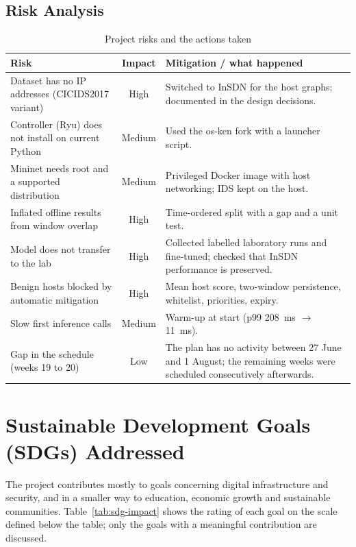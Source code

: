 \begin{appendices}
\section{Risk Analysis}
\begin{table}[htbp]
\centering
\caption{Project risks and the actions taken}
\label{tab:risks}
\small
\begin{tabularx}{\textwidth}{|p{4.0cm}|c|X|}
\hline
\textbf{Risk} & \textbf{Impact} & \textbf{Mitigation / what happened} \\ \hline
Dataset has no IP addresses (CICIDS2017 variant) & High & Switched to InSDN for the host graphs; documented in the design decisions. \\ \hline
Controller (Ryu) does not install on current Python & Medium & Used the os-ken fork with a launcher script. \\ \hline
Mininet needs root and a supported distribution & Medium & Privileged Docker image with host networking; IDS kept on the host. \\ \hline
Inflated offline results from window overlap & High & Time-ordered split with a gap and a unit test. \\ \hline
Model does not transfer to the lab & High & Collected labelled laboratory runs and fine-tuned; checked that InSDN performance is preserved. \\ \hline
Benign hosts blocked by automatic mitigation & High & Mean host score, two-window persistence, whitelist, priorities, expiry. \\ \hline
Slow first inference calls & Medium & Warm-up at start (p99 208~ms $\to$ 11~ms). \\ \hline
Gap in the schedule (weeks 19 to 20) & Low & The plan has no activity between 27 June and 1 August; the remaining weeks were scheduled consecutively afterwards. \\ \hline
\end{tabularx}
\end{table}

\chapter{Sustainable Development Goals (SDGs) Addressed}
The project contributes mostly to goals concerning digital infrastructure and security, and in a smaller way to education, economic growth and sustainable communities. Table~\ref{tab:sdg-impact} shows the rating of each goal on the scale defined below the table; only the goals with a meaningful contribution are discussed.


\end{appendices}
